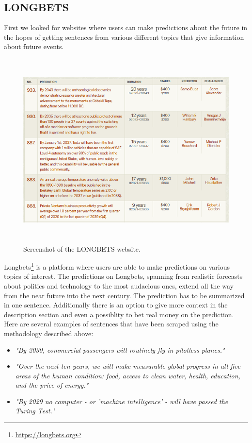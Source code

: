 \documentclass[a4paper,10pt]{report} %
\begin{document}
\subsection{LONGBETS}
First we looked for websites where users can make predictions about the future in the hopes of getting sentences from various different topics that give information about future events.
\begin{figure}
  \centering
  \includegraphics[height=10cm]{img/longbets.png}
  \caption{Screenshot of the LONGBETS website.}
  \label{fig:longbets}
\end{figure}
Longbets\footnote{\url{https://longbets.org}} is a platform where users are able to make predictions on various topics of interest.
The predictions on Longbets, spanning from realistic forecasts about politics and technology to the most audacious ones, extend all the way from the near future into the next century.
The prediction has to be summarized in one sentence. Additionally there is an option to give more context in the description section and even a possiblity to bet real money on the prediction.      
Here are several examples of sentences that have been scraped using the methodology described above:
\begin{itemize}
  \item \textit{"By 2030, commercial passengers will routinely fly in pilotless planes."}
  \item \textit{"Over the next ten years, we will make measurable global progress in all five areas of the human condition: food, access to clean water, health, education, and the price of energy."}
  \item \textit{"By 2029 no computer - or 'machine intelligence' - will have passed the Turing Test."}
\end{itemize}
    
\end{document}
